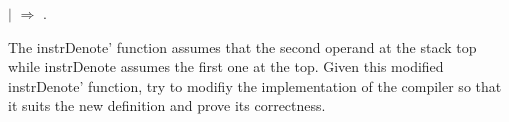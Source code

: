 \begin{coqdoccode}
\coqdocindent{8.00em}
\ensuremath{|} \coqdocvar{\_} \ensuremath{\Rightarrow} \coqdoceol
\coqdocindent{8.00em}
\coqdoceol
\coqdocindent{1.00em}
.\coqdoceol
\coqdocemptyline
\end{coqdoccode}
The instrDenote' function assumes that the second operand at the stack top while instrDenote assumes the first one at the top. Given this modified instrDenote' function, try to modifiy the implementation of the compiler so that it suits the new definition and prove its correctness. \begin{coqdoccode}
\coqdocemptyline
\end{coqdoccode}

